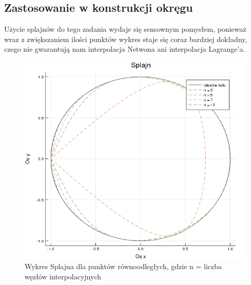 \documentclass[paper=a4, fontsize=11pt]{scrartcl} %
\numberwithin{equation}{section} %
\numberwithin{figure}{section} %
\numberwithin{table}{section} %
\begin{document}
\subsection{Zastosowanie w konstrukcji okręgu}
Użycie splajnów do tego zadania wydaje się sensownym pomysłem, ponieważ wraz z zwiększaniem ilości punktów wykres staje się coraz bardziej dokładny, czego nie gwarantują nam interpolacja Netwona ani interpolacja Lagrange'a. 
\begin{figure}[h!]
\centering
 \includegraphics[width=0.8\linewidth]{splajn.png}
  \caption{Wykres Splajna dla punktów równoodległych, gdzie n = liczba węzłów interpolacyjnych}
  \label{przedzialy}
\end{figure}
\FloatBarrier
\end{document}
